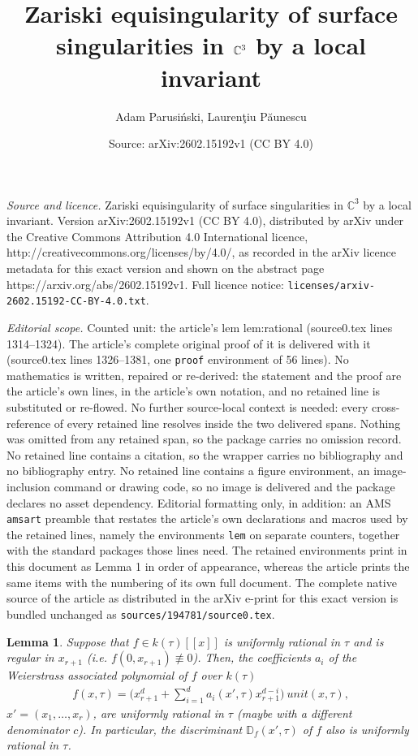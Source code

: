 \documentclass[10pt,a4paper]{amsart}
\title{Zariski equisingularity of surface singularities in $\C^3$ by a local invariant}
\author{Adam Parusi\'nski, Lauren\c{t}iu P\u{a}unescu}
\date{Source: arXiv:2602.15192v1 (CC BY 4.0)}
\newcommand{\C}{\mathbb{C}}
\newtheorem{lem}{Lemma}
\newcommand{\D}{\mathbb{D}}
\newcommand{\kk}{{k}}
\begin{document}
\maketitle

\noindent\emph{Source and licence.} Zariski equisingularity of surface singularities in $\C^3$ by a local invariant. Version arXiv:2602.15192v1 (CC BY 4.0), distributed by arXiv under the Creative Commons Attribution 4.0 International licence, http://creativecommons.org/licenses/by/4.0/, as recorded in the arXiv licence metadata for this exact version and shown on the abstract page https://arxiv.org/abs/2602.15192v1. Full licence notice: \texttt{licenses/arxiv-2602.15192-CC-BY-4.0.txt}.\par\smallskip

\noindent\textit{Editorial scope.} Counted unit: the article's lem lem:rational (source0.tex lines 1314--1324). The article's complete original proof of it is delivered with it (source0.tex lines 1326--1381, one \texttt{proof} environment of 56 lines). No mathematics is written, repaired or re-derived: the statement and the proof are the article's own lines, in the article's own notation, and no retained line is substituted or re-flowed.  No further source-local context is needed: every cross-reference of every retained line resolves inside the two delivered spans.  Nothing was omitted from any retained span, so the package carries no omission record.  No retained line contains a citation, so the wrapper carries no bibliography and no bibliography entry.  No retained line contains a figure environment, an image-inclusion command or drawing code, so no image is delivered and the package declares no asset dependency.  Editorial formatting only, in addition: an AMS \texttt{amsart} preamble that restates the article's own declarations and macros used by the retained lines, namely the environments \texttt{lem} on separate counters, together with the standard packages those lines need.  The retained environments print in this document as Lemma 1 in order of appearance, whereas the article prints the same items with the numbering of its own full document.  The complete native source of the article as distributed in the arXiv e-print for this exact version is bundled unchanged as \texttt{sources/194781/source0.tex}.
\begin{lem}\label{lem:rational}
Suppose that $f\in \kk(\tau) [[x]]$ is uniformly rational in $\tau$ and is regular in $x_{r+1}$ (i.e. $f(0,x_{r+1})\not\equiv 0$).  
Then, the coefficients $a_i$  
of the Weierstrass associated polynomial of $f$ over $\kk(\tau)$
\begin{align*}
f(x,\tau) = \Big (x_{r+1}^d + \sum_{i=1}^d a_i(x', \tau) x_{r+1}^{d-i} \Big ) \ unit(x,\tau), 
\end{align*}
$x'= (x_1, \ldots , x_{r})$, are uniformly rational in 
$\tau$ (maybe with a different  denominator $c$). In particular, the discriminant 
$\D_f(x',\tau)$  of   $f$ also is  uniformly rational in $\tau$.
\end{lem}
\end{document}
